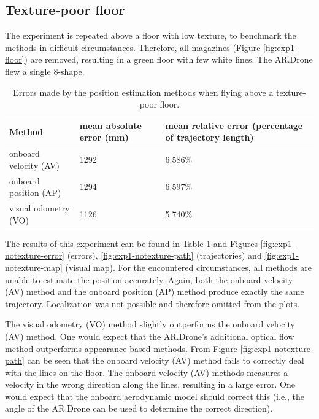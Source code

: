 \subsection{Texture-poor floor}
\label{sec:exp1-texture-poor}
The experiment is repeated above a floor with low texture, to benchmark the methods in difficult circumstances.
Therefore, all magazines (Figure \ref{fig:exp1-floor}) are removed, resulting in a green floor with few white lines.
The AR.Drone flew a single 8-shape.


\begin{table}[htb!]
    \centering
    \begin{tabular}
        { | l | l | l | } 
	\hline
	Method & mean absolute error (\small{mm}) & mean relative error (percentage of trajectory length) \\
        \hline
        onboard velocity (AV) & 1292 & 6.586\% \\
	onboard position (AP) & 1294 & 6.597\% \\
	visual odometry (VO) & 1126 & 5.740\% \\
	\hline
    \end{tabular}
    \caption{Errors made by the position estimation methods when flying above a texture-poor floor.}
    \label{tab:res_mapping-poor}
\end{table}


The results of this experiment can be found in Table \ref{tab:res_mapping-poor} and Figures \ref{fig:exp1-notexture-error} (errors), \ref{fig:exp1-notexture-path} (trajectories) and \ref{fig:exp1-notexture-map} (visual map).
For the encountered circumstances, all methods are unable to estimate the position accurately.
Again, both the onboard velocity (AV) method and the onboard position (AP) method produce exactly the same trajectory.
Localization was not possible and therefore omitted from the plots.

The visual odometry (VO) method slightly outperforms the onboard velocity (AV) method.
One would expect that the AR.Drone's additional optical flow method outperforms appearance-based methods.
From Figure \ref{fig:exp1-notexture-path} can be seen that the onboard velocity (AV) method fails to correctly deal with the lines on the floor.
The onboard velocity (AV) methods measures a velocity in the wrong direction along the lines, resulting in a large error.
One would expect that the onboard aerodynamic model should correct this (i.e., the angle of the AR.Drone can be used to determine the correct direction).

